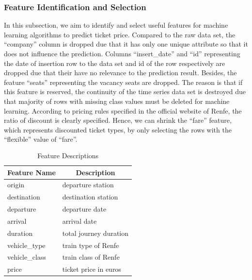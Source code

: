 \documentclass[conference]{IEEEtran}
\begin{document}
\subsubsection{Feature Identification and Selection}
In this subsection, we aim to identify and select useful features for machine learning algorithms to predict ticket price. Compared to the raw data set, the “company” column is dropped due that it has only one unique attribute so that it does not influence the prediction. Columns “insert\_date” and “id” representing the date of insertion row to the data set and id of the row respectively are dropped due that their have no relevance to the prediction result. Besides, the feature “seats” representing the vacancy seats are dropped. The reason is that if this feature is reserved, the continuity of the time series data set is destroyed due that majority of rows with missing class values must be deleted for machine learning. According to pricing rules specified in the official website of Renfe\cite{b21}, the ratio of discount is clearly specified. Hence, we can shrink  the “fare” feature, which represents discounted ticket types, by only selecting the rows with the “flexible” value of “fare”.
\begin{table}[ht]
\begin{center}
\caption{Feature Descriptions}
\begin{tabular}{|l|l|}
\hline
\multicolumn{1}{|c|}{\textbf{Feature Name}} & \multicolumn{1}{c|}{\textbf{Description}} \\ \hline
origin                                      & departure station                         \\ \hline
destination                                 & destination station                       \\ \hline
departure                                   & departure date                            \\ \hline
arrival                                     & arrival date                              \\ \hline
duration                                    & total journey duration                    \\ \hline
vehicle\_type                               & train type of Renfe                       \\ \hline
vehicle\_class                              & train class of Renfe                      \\ \hline
price                                       & ticket price in euros                     \\ \hline
\end{tabular}

\end{center}
\end{table}
\end{document}
